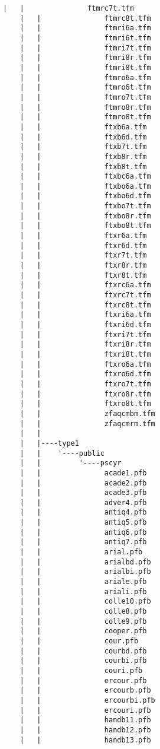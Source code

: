 \begin{lstlisting}[frame=tb, extendedchars=false, breaklines=false, basicstyle=\footnotesize\upshape ,columns=flexible ,keepspaces=true , lineskip={-7.0pt} ]
    |   |               ftmrc7t.tfm
    |   |               ftmrc8t.tfm
    |   |               ftmri6a.tfm
    |   |               ftmri6t.tfm
    |   |               ftmri7t.tfm
    |   |               ftmri8r.tfm
    |   |               ftmri8t.tfm
    |   |               ftmro6a.tfm
    |   |               ftmro6t.tfm
    |   |               ftmro7t.tfm
    |   |               ftmro8r.tfm
    |   |               ftmro8t.tfm
    |   |               ftxb6a.tfm
    |   |               ftxb6d.tfm
    |   |               ftxb7t.tfm
    |   |               ftxb8r.tfm
    |   |               ftxb8t.tfm
    |   |               ftxbc6a.tfm
    |   |               ftxbo6a.tfm
    |   |               ftxbo6d.tfm
    |   |               ftxbo7t.tfm
    |   |               ftxbo8r.tfm
    |   |               ftxbo8t.tfm
    |   |               ftxr6a.tfm
    |   |               ftxr6d.tfm
    |   |               ftxr7t.tfm
    |   |               ftxr8r.tfm
    |   |               ftxr8t.tfm
    |   |               ftxrc6a.tfm
    |   |               ftxrc7t.tfm
    |   |               ftxrc8t.tfm
    |   |               ftxri6a.tfm
    |   |               ftxri6d.tfm
    |   |               ftxri7t.tfm
    |   |               ftxri8r.tfm
    |   |               ftxri8t.tfm
    |   |               ftxro6a.tfm
    |   |               ftxro6d.tfm
    |   |               ftxro7t.tfm
    |   |               ftxro8r.tfm
    |   |               ftxro8t.tfm
    |   |               zfaqcmbm.tfm
    |   |               zfaqcmrm.tfm
    |   |               
    |   |----type1
    |   |    '----public
    |   |         '----pscyr
    |   |               acade1.pfb
    |   |               acade2.pfb
    |   |               acade3.pfb
    |   |               adver4.pfb
    |   |               antiq4.pfb
    |   |               antiq5.pfb
    |   |               antiq6.pfb
    |   |               antiq7.pfb
    |   |               arial.pfb
    |   |               arialbd.pfb
    |   |               arialbi.pfb
    |   |               ariale.pfb
    |   |               ariali.pfb
    |   |               colle10.pfb
    |   |               colle8.pfb
    |   |               colle9.pfb
    |   |               cooper.pfb
    |   |               cour.pfb
    |   |               courbd.pfb
    |   |               courbi.pfb
    |   |               couri.pfb
    |   |               ercour.pfb
    |   |               ercourb.pfb
    |   |               ercourbi.pfb
    |   |               ercouri.pfb
    |   |               handb11.pfb
    |   |               handb12.pfb
    |   |               handb13.pfb

\end{lstlisting}
